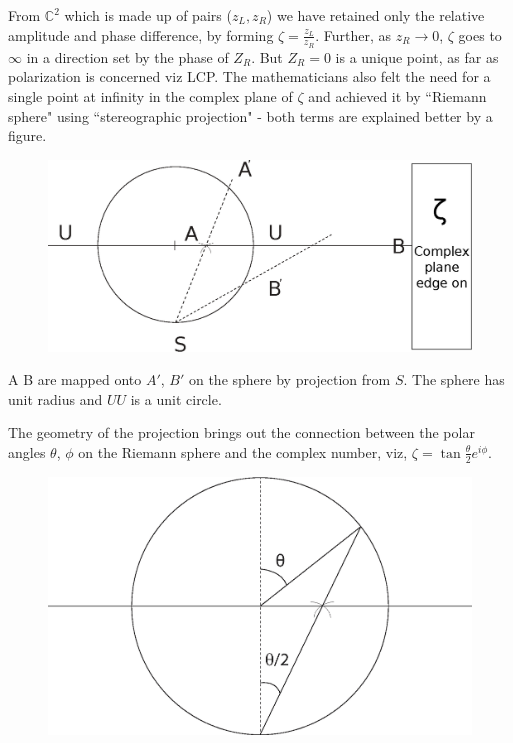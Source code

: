 From $\mathbb{C}^2$ which is made up of pairs ($z_L , z_R$) we have retained only the relative
amplitude and phase difference, by forming $\zeta = \frac{z_L}{z_R}$. Further, as $z_R \to 0$, $\zeta$
goes to $\infty$ in a direction set by the phase of $Z_R$. But $Z_R = 0$ is a unique point,
as far as polarization is concerned viz LCP. The mathematicians also felt the
need for a single point at infinity in the complex plane of $\zeta$ and achieved it by
``Riemann sphere" using  ``stereographic projection" - both terms are explained
better by a figure.
\medskip

\begin{figure}[H]
\centering
\includegraphics[scale=0.2]{src/images/chap26/4.jpg}
\end{figure}
\bigskip

A B are mapped onto $A'$, $B'$ on the sphere by projection from $S$. The sphere
has unit radius and $U U$ is a unit circle.


The geometry of the projection brings out the connection between the polar
angles $\theta$, $\phi$ on the Riemann sphere and the complex number, viz, $\zeta = \tan \frac{\theta}{2} e^{i\phi}$.
\medskip

\begin{figure}[H]
\centering
\includegraphics[scale=0.2]{src/images/chap26/5.jpg}
\end{figure}
\bigskip

